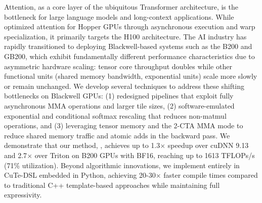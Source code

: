 Attention, as a core layer of the ubiquitous Transformer architecture, is the bottleneck for large language models and long-context applications.
While \fat optimized attention for Hopper GPUs through asynchronous execution and warp specialization, it primarily targets the H100 architecture.
The AI industry has rapidly transitioned to deploying Blackwell-based systems such as the B200 and GB200, which exhibit fundamentally different performance characteristics due to asymmetric hardware scaling: tensor core throughput doubles while other functional units (shared memory bandwidth, exponential units) scale more slowly or remain unchanged.
We develop several techniques to address these shifting bottlenecks on Blackwell GPUs: (1) redesigned pipelines that exploit fully asynchronous MMA operations and larger tile sizes, (2) software-emulated exponential and conditional softmax rescaling that reduces non-matmul operations, and (3) leveraging tensor memory and the 2-CTA MMA mode to reduce shared memory traffic and atomic adds in the backward pass.
We demonstrate that our method, \faf, achieves up to 1.3$\times$ speedup over cuDNN 9.13 and 2.7$\times$ over Triton on B200 GPUs with BF16, reaching up to 1613 TFLOPs/s (71\% utilization).
Beyond algorithmic innovations, we implement \faf entirely in CuTe-DSL embedded in Python, achieving 20-30$\times$ faster compile times compared to traditional C++ template-based approaches while maintaining full expressivity. 




